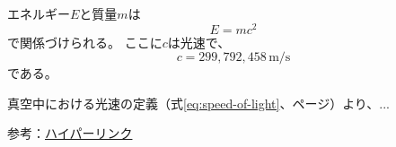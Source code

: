 \documentclass[11pt, dvipdfmx]{jsarticle}
\begin{document}
エネルギー$E$と質量$m$は
\begin{equation}
  \label{eq:einstein}
  E = mc^{2}
\end{equation}
で関係づけられる。
ここに$c$は光速で、
\begin{equation}
  \label{eq:speed-of-light}
  c = 299{,}792{,}458 \, \mathrm{m/s}
\end{equation}
である。

真空中における光速の定義（式\ref{eq:speed-of-light}、\pageref{eq:speed-of-light}ページ）より、...

参考：\href{https://texwiki.texjp.org/?hyperref}{ハイパーリンク}
\end{document}

